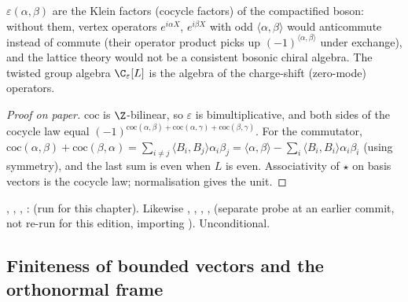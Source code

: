 \begin{physics}
$\varepsilon(\alpha,\beta)$ are the Klein factors (cocycle factors) of the compactified boson: without them,
vertex operators $e^{i\alpha X}$, $e^{i\beta X}$ with odd $\langle\alpha,\beta\rangle$ would anticommute instead of commute
(their operator product picks up $(-1)^{\langle\alpha,\beta\rangle}$ under exchange), and the lattice theory would not
be a consistent bosonic chiral algebra. The twisted group algebra $\C_\varepsilon[L]$ is the algebra of the
charge-shift (zero-mode) operators.
\end{physics}

\begin{proof}[Proof on paper]
$\mathrm{coc}$ is $\Z$-bilinear, so $\varepsilon$ is bimultiplicative, and both sides of the cocycle law equal
$(-1)^{\mathrm{coc}(\alpha,\beta)+\mathrm{coc}(\alpha,\gamma)+\mathrm{coc}(\beta,\gamma)}$. For the commutator,
$\mathrm{coc}(\alpha,\beta)+\mathrm{coc}(\beta,\alpha) = \sum_{i\ne j}\langle B_i,B_j\rangle\alpha_i\beta_j =
\langle\alpha,\beta\rangle-\sum_i\langle B_i,B_i\rangle\alpha_i\beta_i$ (using symmetry), and the last sum is even when $L$ is
even. Associativity of $\star$ on basis vectors is the cocycle law; normalisation gives the unit.
\end{proof}

\begin{status}
\allowbreak{}\allowbreak{}\allowbreak{}, \allowbreak{}\allowbreak{}\allowbreak{},
\allowbreak{}\allowbreak{}\allowbreak{}, \allowbreak{}\allowbreak{}\allowbreak{}:
 (run for this chapter). Likewise \allowbreak{}\allowbreak{}\allowbreak{}\allowbreak{},
\allowbreak{}\allowbreak{}, \allowbreak{}\allowbreak{}, \allowbreak{}\allowbreak{},
 (separate probe at an earlier commit, not re-run for this edition, importing ). Unconditional.
\end{status}

\subsection{Finiteness of bounded vectors and the orthonormal frame}

